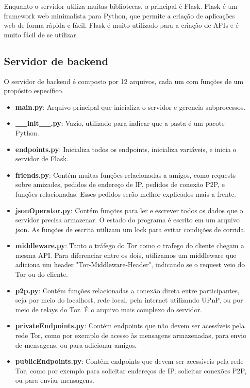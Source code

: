 Enquanto o servidor utiliza muitas bibliotecas, a principal é Flask. Flask é um framework web minimalista para Python, que permite a criação de aplicações web de forma rápida e fácil. Flask é muito utilizado para a criação de APIs e é muito fácil de se utilizar.

\subsection{Servidor de backend}

O servidor de backend é composto por 12 arquivos, cada um com funções de um propósito específico.

\begin{itemize}
    \item \textbf{main.py}: Arquivo principal que inicializa o servidor e gerencia subprocessos.
    \item \textbf{\_\_init\_\_.py}: Vazio, utilizado para indicar que a pasta é um pacote Python.
    \item \textbf{endpoints.py}: Inicializa todos os endpoints, inicializa variáveis, e inicia o servidor de Flask.
    \item \textbf{friends.py}: Contém muitas funções relacionadas a amigos, como requests sobre amizades, pedidos de endereço de IP, pedidos de conexão P2P, e funções relacionadas. Esses pedidos serão melhor explicados mais a frente.
    \item \textbf{jsonOperator.py}: Contém funções para ler e escrever todos os dados que o servidor precisa armazenar. O estado do programa é escrito em um arquivo json. As funções de escrita utilizam um lock para evitar condições de corrida.
    \item \textbf{middleware.py}: Tanto o tráfego do Tor como o trafego do cliente chegam a mesma API. Para diferenciar entre os dois, utilizamos um middleware que adiciona um header "Tor-Middleware-Header", indicando se o request veio do Tor ou do cliente.
    \item \textbf{p2p.py}: Contém funções relacionadas a conexão direta entre participantes, seja por meio do localhost, rede local, pela internet utilizando UPnP, ou por meio de relays do Tor. É o arquivo mais complexo do servidor.
    \item \textbf{privateEndpoints.py}: Contém endpoints que não devem ser acessíveis pela rede Tor, como por exemplo de acesso às mensagens armazenadas, para envio de mensagens, ou para adicionar amigos.
    \item \textbf{publicEndpoints.py}: Contém endpoints que devem ser acessíveis pela rede Tor, como por exemplo para solicitar endereços de IP, solicitar conexões P2P, ou para enviar mensagens.

\end{itemize}
